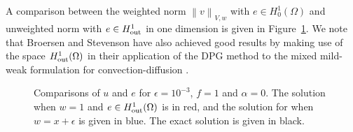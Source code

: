 \documentclass[final,leqno]{siamltex}
\newcommand{\nor}[1]{\left\| #1 \right\|}
\begin{document}
A comparison between the weighted norm $\nor{v}_{V,w}$ with $e\in H^1_0(\Omega)$ and unweighted norm with $e\in H^1_{\rm out}$ in one dimension is given in Figure~\ref{fig:robustComparison1D}.   We note that Broersen and Stevenson have also achieved good results by making use of the space $H^1_{\rm out}(\Omega)$ in their application of the DPG method to the mixed mild-weak formulation for convection-diffusion \cite{broersenStevenson}.
\begin{figure}[!h]
\centering
{}
\caption{Comparisons of $u$ and $e$ for $\epsilon = 10^{-3}$, $f=1$ and $\alpha = 0$. The solution when $w = 1$ and $e\in H^1_{\rm out}(\Omega)$ is in red, and the solution for when $w = x+\epsilon$ is given in blue.  The exact solution is given in black.}
\label{fig:robustComparison1D}
\end{figure}
\end{document}
